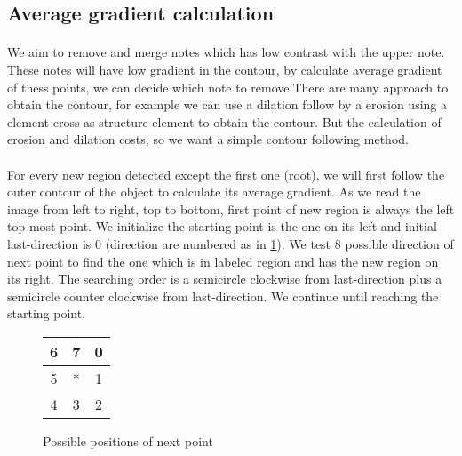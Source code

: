 \subsection{Average gradient calculation}
\paragraph{} We aim to remove and merge notes which has low contrast with the upper note. These notes will have low gradient in the contour, by calculate average gradient of thess points, we can decide which note to remove.There are many approach to obtain the contour, for example we can use a dilation follow by a erosion using a element cross as structure element to obtain the contour. But the calculation of erosion and dilation costs, so we want a simple contour following method. 
\paragraph{} For every new region detected except the first one (root), we will first follow the outer contour of the object to calculate its average gradient. As we read the image from left to right, top to bottom, first point of new region is always the left top most point. We initialize the starting point is the one on its left and initial last-direction is 0 (direction are numbered as in \ref{directionToSearch}). We test 8 possible direction of next point to find the one which is in labeled region and has the new region on its right. The searching order is a semicircle clockwise from last-direction plus a semicircle counter clockwise from last-direction. We continue until reaching the starting point. 
\begin{figure}
\begin{tabular}{|c|c|c|}
\hline 
6 & 7 & 0 \\ 
\hline 
5 & * & 1 \\ 
\hline 
4 & 3 & 2 \\ 
\hline 
\end{tabular}  
\centering
\caption{Possible positions of next point}
\label{directionToSearch}
\end{figure}
